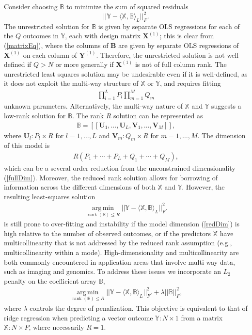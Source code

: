 \documentclass[12pt]{article}
\def\Y{\mathbf{Y}}
\def\U{\mathbf{U}}
\def\X{\mathbf{X}}
\def\XX{\mathbb{X}}
\def\YY{\mathbb{Y}}
\def\V{\mathbf{V}}
\def\B{\mathbf{B}}
\def\BB{\mathbb{B}}
\def\B{\mathbf{B}}
\def\tp#1{[\![#1]\!]}
\newcommand{\tprod}[3] {
  \langle #1, #2 \rangle_{#3}}
\DeclareMathOperator*{\amin}{arg\,min}
\def\argmin#1{\underset{#1}{\amin}}
\DeclareMathOperator*{\rank}{rank}
\begin{document}
Consider choosing $\BB$ to minimize the sum of squared residuals  
\[||\YY- \tprod{\XX}{\BB}{L}||_F^2.\] 
The unrestricted solution for $\BB$ is given by separate OLS regressions for each of the $Q$ outcomes in $\YY$, each with design matrix $\X^{(1)}$; this is clear from (\ref{matrixEq}), where the columns of $\B$ are given by separate OLS regressions of $\X^{(1)}$ on each column of $\Y^{(1)}$. Therefore, the unrestricted solution is not well-defined if $Q > N$ or more generally if $\X^{(1)}$ is not of full column rank.  The unrestricted least squares solution may be undesirable even if it is well-defined, as it does not exploit the multi-way structure of $\XX$ or $\YY$, and requires fitting 
\begin{align}
\prod_{l=1}^L P_l \prod_{m=1}^M Q_m \label{fullDim}
\end{align}
unknown parameters.  
Alternatively, the multi-way nature of $\XX$ and $\YY$ suggests a low-rank solution for $\BB$. The rank $R$ solution can be represented as
\begin{align}
\BB = \tp{\U_1,\hdots,\U_L, \V_1,\hdots,\V_M}, \label{Bfac}
\end{align}
where $\U_l: P_l \times R$ for $l=1,\hdots,L$ and $\V_m: Q_m \times R$ for $m=1,\hdots,M$.  The dimension of this model is 
\begin{align}
R \left (P_1+\cdots+P_L+Q_1+\cdots+Q_M \right ), \label{redDim}
\end{align} 
which can be a several order reduction from the unconstrained dimensionality (\ref{fullDim}). Moreover, the reduced rank solution allows for borrowing of information across the different dimensions of both $\XX$ and $\YY$.  However, the resulting least-squares solution
\begin{align}
\argmin{\rank(\BB)\leq R} ||\YY- \tprod{\XX}{\BB}{L}||_F^2. \label{lsEq}
\end{align}   
is still prone to over-fitting and instability if the model dimension (\ref{redDim}) is high relative to the number of observed outcomes, or if the predictors $\XX$ have multicollinearity that is not addressed by the reduced rank assumption (e.g., multicollinearity within a mode).  High-dimensionality and multicollinearity are both commonly encountered in application areas that involve multi-way data, such as imaging and genomics.  To address these issues we incorporate an $L_2$ penalty on the coefficient array $\BB$, 
\begin{align}
\argmin{\rank(\BB)\leq R} ||\YY- \tprod{\XX}{\BB}{L}||_F^2. + \lambda ||\BB||_F^2, \label{ridgeEq}
\end{align}
where $\lambda$ controls the degree of penalization.  This objective is equivalent to that of ridge regression when predicting a vector outcome $\YY: N \times 1$ from a matrix $\XX: N \times P$, where necessarily $R=1$.  %
   
\end{document}
